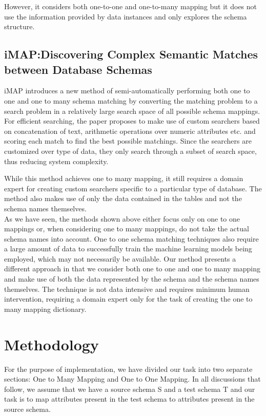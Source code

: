 \documentclass[conference]{IEEEtran}
\begin{document}
However, it considers both one-to-one and one-to-many mapping but it does not use the information provided by data instances and only explores the schema structure.
\fi

\subsection*{\textbf{iMAP:Discovering Complex Semantic Matches between Database Schemas}\cite{ref5}}
iMAP introduces a new method of semi-automatically performing both one to one and one to many schema matching by converting the matching problem to a search problem in a relatively large search space of all possible schema mappings. For efficient searching, the paper proposes to make use of custom searchers based on concatenation of text, arithmetic operations over numeric attributes etc. and scoring each match to find the best possible matchings. Since the searchers are customized over type of data, they only search through a subset of search space, thus reducing system complexity. 

While this method achieves one to many mapping, it still requires a domain expert for creating custom searchers specific to a particular type of database. The method also makes use of only the data contained in the tables and not the schema names themselves.\\

\noindent
As we have seen, the methods shown above either focus only on one to one mappings or, when considering one to many mappings, do not take the actual schema names into account. One to one schema matching techniques also require a large amount of data to successfully train the machine learning models being employed, which may not necessarily be available. Our method presents a different approach in that we consider both one to one and one to many mapping and make use of both the data represented by the schema and the schema names themselves. The technique is not data intensive and requires minimum human intervention, requiring a domain expert only for the task of creating the one to many mapping dictionary.

\section{Methodology}
For the purpose of implementation, we have divided our task into two separate sections: One to Many Mapping and One to One Mapping. In all discussions that follow, we assume that we have a source schema S and a test schema T and our task is to map attributes present in the test schema to attributes present in the source schema. 
\end{document}
